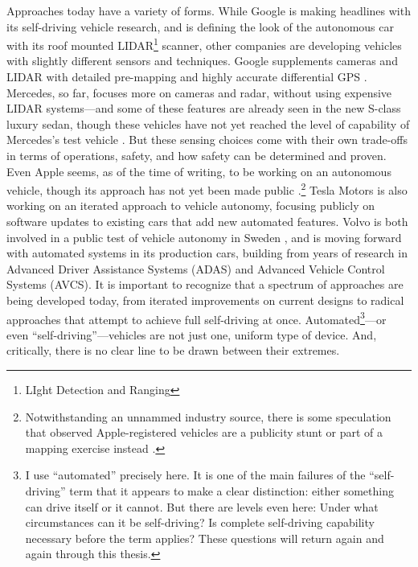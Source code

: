 Approaches today have a variety of forms. While Google is making
headlines with its self-driving vehicle research, and is defining the
look of the autonomous car with its roof mounted LIDAR\footnote{LIght
  Detection and Ranging} scanner, other
companies are developing vehicles with slightly different sensors and
techniques. Google supplements cameras and LIDAR with detailed pre-mapping and highly accurate
differential GPS \cite{guizzoHow}. Mercedes, so far, focuses more on
cameras and radar, 
without using expensive LIDAR systems---and some of these features are
already seen in the new S-class luxury sedan, though these vehicles
have not yet reached the level of capability of Mercedes's
test vehicle \cite{makingBertha}. But these sensing choices come with their own
trade-offs in terms of operations, safety, and how safety can be
determined and proven. Even Apple seems, as of the time of writing,
to be working on an autonomous vehicle, though its approach has not
yet been made public \cite{taylorApple}.\footnote{Notwithstanding an
  unnammed industry source, there is some
  speculation that observed Apple-registered vehicles are a publicity stunt or part of
  a mapping exercise instead \cite{bonningtonCurious}.} Tesla Motors
is also working on an iterated 
approach to vehicle autonomy, focusing publicly on software updates to
existing cars that add new automated features. Volvo is both involved
in a public test of vehicle autonomy in Sweden \cite{volvoPR}, and is moving forward
with automated systems in its production cars, building from years of
research in Advanced Driver Assistance Systems (ADAS) and Advanced
Vehicle Control Systems (AVCS). It is important to recognize that
a spectrum of approaches are being developed today, from iterated
improvements on current designs to radical approaches that attempt to
achieve full self-driving at once. Automated\footnote{I use ``automated''
  precisely here. It is one of the main failures of the
  ``self-driving'' term that it appears to make a clear distinction: 
  either something can drive itself or it cannot. But there are
  levels even here: Under what circumstances can it be self-driving? Is
  complete self-driving capability necessary before the term applies?
  These questions will return again and again through this thesis. }---or even
``self-driving''---vehicles are not just one, uniform type of
device. And, critically, there is no clear
line to be drawn between their extremes.





